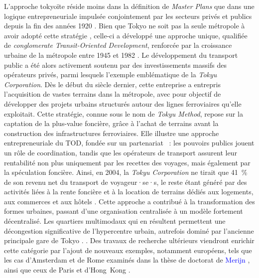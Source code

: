 \begin{refsegment}
{    L'approche tokyoïte réside moins dans la définition de \textit{Master Plans} que dans une logique entrepreneuriale impulsée conjointement par les secteurs privés et publics depuis la fin des années 1920 \textcolor{blue}{\autocite[p.~181-209 (chapitre 7)]{cervero_transit_1998}}. Bien que Tokyo ne soit pas la seule métropole à avoir adopté cette stratégie \textcolor{blue}{\autocite[87]{bertolini_developing_2016}}, celle-ci a développé une approche unique, qualifiée de \textsl{conglomerate Transit-Oriented Development}, renforcée par la croissance urbaine de la métropole entre 1945 et 1982 \textcolor{blue}{\autocite[28-29]{liu_historical_2024}}. Le développement du transport public a été alors activement soutenu par des investissements massifs des opérateurs privés, parmi lesquels l'exemple emblématique de la \textit{Tokyu Corporation}. Dès le début du siècle dernier, cette entreprise a entrepris l'acquisition de vastes terrains dans la métropole, avec pour objectif de développer des projets urbains structurés autour des lignes ferroviaires qu'elle exploitait. Cette stratégie, connue sous le nom de \textit{Tokyu Method}, repose sur la captation de la plus-value foncière, grâce à l’achat de terrains avant la construction des infrastructures ferroviaires. Elle illustre une approche entrepreneuriale du \acrshort{TOD}, fondée sur un partenariat ~: les pouvoirs publics jouent un rôle de coordination, tandis que les opérateurs de transport assurent leur rentabilité non plus uniquement par les recettes des voyages, mais également par la spéculation foncière. Ainsi, en 2004, la \textsl{Tokyu Corporation} ne tirait que 41~\% de son revenu net du transport de voyageur·se·s, le reste étant généré par des activités liées à la rente foncière et à la location de terrains dédiés aux logements, aux commerces et aux hôtels \textcolor{blue}{\autocite[110]{suzuki_financing_2015}}. Cette approche a contribué à la transformation des formes urbaines, passant d’une organisation centralisée à un modèle fortement décentralisé. Les quartiers multimodaux qui en résultent permettent une décongestion significative de l’hypercentre urbain, autrefois dominé par l’ancienne principale gare de Tokyo \textcolor{blue}{\autocite[29]{liu_historical_2024}}.
} \textcolor{blue}{\autocite[109-209]{cervero_transit_1998}}. Des travaux de recherche ultérieurs viendront enrichir cette catégorie par l’ajout de nouveaux exemples, notamment européens, tels que les cas d’Amsterdam et de Rome examinés dans la thèse de doctorat de \textcolor{blue}{Merijn} \textcolor{blue}{\textcite[180-206]{martens_adaptive_2006}}, ainsi que ceux de Paris et d'Hong~Kong \textcolor{blue}{\autocite[4]{knowles_transports_2020}}.%


\end{refsegment}
